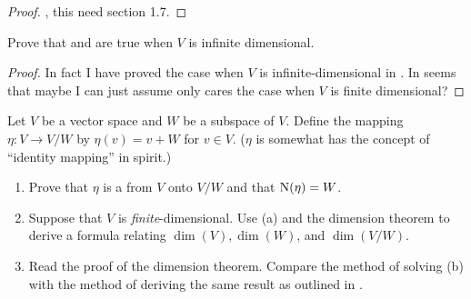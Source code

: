 \begin{proof}
\TODOREF{} , this need section 1.7.
\end{proof}

\begin{exercise} \label{exercise 2.1.41}
Prove that  and  are true when \(V\) is infinite dimensional.
\end{exercise}

\begin{proof}
In fact I have proved the case when \(V\) is infinite-dimensional in .
In seems that maybe I can just assume  only cares the case when \(V\) is finite dimensional?
\end{proof}

\begin{exercise} \label{exercise 2.1.42}
Let \(V\) be a vector space and \(W\) be a subspace of \(V\).
Define the mapping \(\eta: V \to V/W\) by \(\eta(v) = v + W\) for \(v \in V\).
(\(\eta\) is somewhat has the concept of ``identity mapping'' in spirit.)
\begin{enumerate}
\item Prove that \(\eta\) is a \LTRAN{} from \(V\) onto \(V/W\) and that \(\mathrm{N}(\eta) = W\).
\item Suppose that \(V\) is \emph{finite}-dimensional.
    Use (a) and the dimension theorem  to derive a formula relating \(\dim(V), \dim(W)\), and \(\dim(V/W)\).
\item Read the proof of the dimension theorem.
    Compare the method of solving (b) with the method of deriving the same result as outlined in .
\end{enumerate}
\end{exercise}

